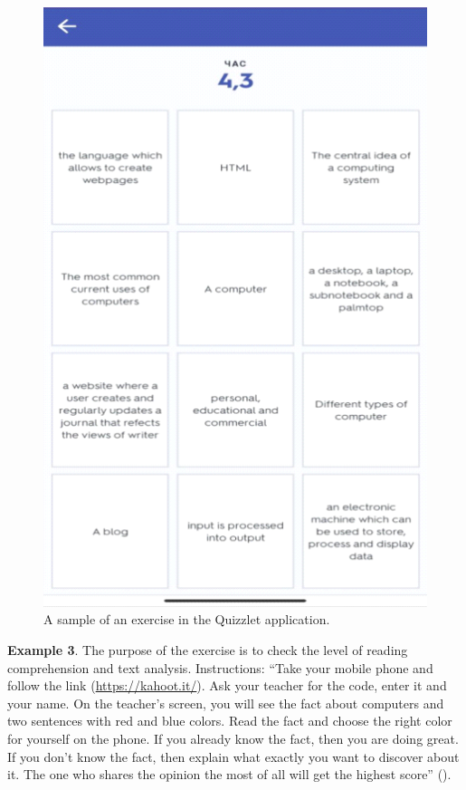 \begin{figure}[htpb]
\centering
\begin{minipage}{.65\textwidth}
\caption{A sample of an exercise in the Quizzlet application.}	
\label{fig-04}
\includegraphics[width=\textwidth]{figure04}
\end{minipage}
\end{figure}

\textbf{Example 3}. The purpose of the exercise is to check the level of reading
comprehension and text analysis. Instructions: \enquote{Take your mobile
phone and follow the link (\url{https://kahoot.it/}). Ask your teacher
for the code, enter it and your name. On the teacher's screen, you will
see the fact about computers and two sentences with red and blue colors.
Read the fact and choose the right color for yourself on the phone. If
you already know the fact, then you are doing great. If you don't know
the fact, then explain what exactly you want to discover about it. The
one who shares the opinion the most of all will get the highest score}
().


